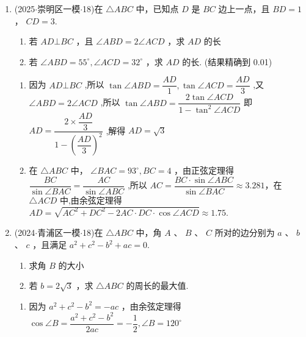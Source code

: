 \begin{enumerate}
\begin{jieda}
\begin{enumerate}
            $\dfrac{a}{2} = bsinC$，故$sinA = 2sinBsinC$，因此$\dfrac{sin^2A}{sinBsinC} = 2sinA$

            $\dfrac{c}{b} + \dfrac{b}{c} = 2\left( {\sin A + \cos A}\right)  = 2\sqrt{2}\sin \left( {A + \dfrac{\pi }{4}}\right)$ . 当$A = \dfrac{\pi }{4}$ 时 $\dfrac{{b}^{2} + {c}^{2}}{bc}$ 有最大值 $2\sqrt{2}$.

            \ps 高的条件用面积处理亦可.
        \end{enumerate}
    \end{jieda}

    \item (2025$\cdot$崇明区一模$\cdot$18)在 $\bigtriangleup  {ABC}$ 中，已知点 $D$ 是 ${BC}$ 边上一点，且 ${BD} = 1$ ， ${CD} = 3$.
    \begin{enumerate}
        \item 若 ${AD}\bot {BC}$ ，且 $\angle {ABD} = 2\angle {ACD}$ ，求 ${AD}$ 的长
        \item 若 $\angle {ABD} = {55}^{ \circ  },\angle {ACD} = {32}^{ \circ  }$ ，求 ${AD}$ 的长. (结果精确到 0.01)
    \end{enumerate}
    \begin{jieda}
        \begin{enumerate}
            \item 因为 ${AD} \bot  {BC}$ ,所以 $\tan \angle {ABD} = \dfrac{AD}{1},\tan \angle {ACD} =  \dfrac{AD}{3}$ ,又 $\angle {ABD} = 2\angle {ACD}$ ,所以 $\tan \angle {ABD} = \dfrac{2\tan \angle {ACD}}{1 - {\tan }^{2}\angle {ACD}}$ 即 ${AD} = \dfrac{2 \times  \dfrac{AD}{3}}{1 - {\left( \dfrac{AD}{3}\right) }^{2}}$ ,解得 ${AD} = \sqrt{3}$
            \item 在 $\bigtriangleup {ABC}$ 中， $\angle {BAC} = {93}^{ \circ  },{BC} = 4$ ，由正弦定理得 $\dfrac{BC}{\sin \angle {BAC}} = \dfrac{AC}{\sin \angle {ABC}}$ ,所以 ${AC} = \dfrac{{BC} \cdot  \sin \angle {ABC}}{\sin \angle {BAC}} \approx 3.281$，在 $\bigtriangleup {ACD}$ 中,由余弦定理得${AD} = \sqrt{A{C}^{2} + D{C}^{2} - {2AC} \cdot  {DC} \cdot  \cos \angle {ACD}} \approx  {1.75}.$
        \end{enumerate}
    \end{jieda}

    \item (2024$\cdot$青浦区一模$\cdot$18)在 $\bigtriangleup {ABC}$ 中，角 $A$ 、 $B$ 、 $C$ 所对的边分别为 $a$ 、 $b$ 、 $c$ ，且满足 ${a}^{2} + {c}^{2} - {b}^{2} +  {ac} = 0.$
    \begin{enumerate}
        \item 求角 $B$ 的大小
        \item 若 $b = 2\sqrt{3}$ ，求 $\bigtriangleup  {ABC}$ 的周长的最大值.
    \end{enumerate}
    \begin{jieda}
        \begin{enumerate}
            \item 因为 ${a}^{2} + {c}^{2} - {b}^{2} =  - {ac}$ ，由余弦定理得 $\cos \angle B =  \dfrac{{a}^{2} + {c}^{2} - {b}^{2}}{2ac} =  - \dfrac{1}{2},\angle B = {120}^{ \circ  }$
            

\end{enumerate}
\end{jieda}
\end{enumerate}
